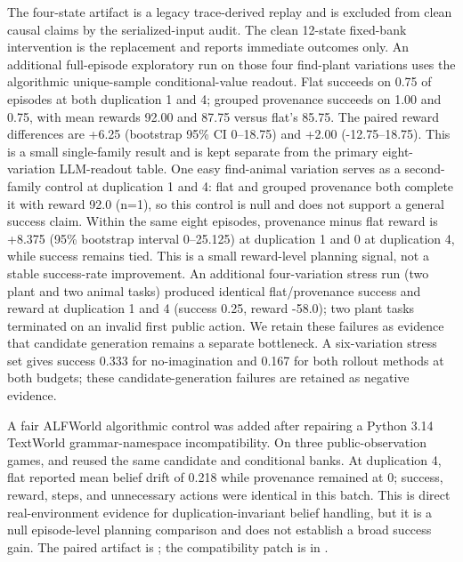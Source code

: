 \documentclass[10pt]{article}
\begin{document}
The four-state \texttt{} artifact is a legacy trace-derived replay and is excluded from clean causal claims by the serialized-input audit. The clean 12-state fixed-bank intervention is the replacement and reports immediate outcomes only. An additional full-episode exploratory run on those four find-plant variations uses the algorithmic unique-sample conditional-value readout. Flat succeeds on 0.75 of episodes at both duplication 1 and 4; grouped provenance succeeds on 1.00 and 0.75, with mean rewards 92.00 and 87.75 versus flat's 85.75. The paired reward differences are +6.25 (bootstrap 95\% CI 0--18.75) and +2.00 (-12.75--18.75). This is a small single-family result and is kept separate from the primary eight-variation LLM-readout table. One easy find-animal variation serves as a second-family control at duplication 1 and 4: flat and grouped provenance both complete it with reward 92.0 (n=1), so this control is null and does not support a general success claim. Within the same eight episodes, provenance minus flat reward is +8.375 (95\% bootstrap interval 0--25.125) at duplication 1 and 0 at duplication 4, while success remains tied. This is a small reward-level planning signal, not a stable success-rate improvement. An additional four-variation stress run (two plant and two animal tasks) produced identical flat/provenance success and reward at duplication 1 and 4 (success 0.25, reward -58.0); two plant tasks terminated on an invalid first public action. We retain these failures as evidence that candidate generation remains a separate bottleneck. A six-variation \texttt{} stress set gives success 0.333 for no-imagination and 0.167 for both rollout methods at both budgets; these candidate-generation failures are retained as negative evidence.

A fair ALFWorld algorithmic control was added after repairing a Python 3.14 TextWorld grammar-namespace incompatibility. On three public-observation games, \texttt{} and \texttt{} reused the same candidate and conditional banks. At duplication 4, flat reported mean belief drift of 0.218 while provenance remained at 0; success, reward, steps, and unnecessary actions were identical in this batch. This is direct real-environment evidence for duplication-invariant belief handling, but it is a null episode-level planning comparison and does not establish a broad success gain. The paired artifact is \texttt{}; the compatibility patch is in \texttt{}.
\end{document}
